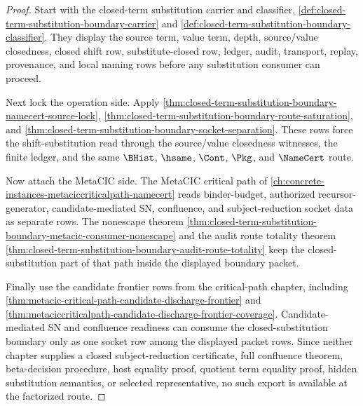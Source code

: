 \begin{proof}
Start with the closed-term substitution carrier and classifier, \autoref{def:closed-term-substitution-boundary-carrier} and \autoref{def:closed-term-substitution-boundary-classifier}. They display the source term, value term, depth, source/value closedness, closed shift row, substitute-closed row, ledger, audit, transport, replay, provenance, and local naming rows before any substitution consumer can proceed.

Next lock the operation side. Apply \autoref{thm:closed-term-substitution-boundary-namecert-source-lock}, \autoref{thm:closed-term-substitution-boundary-route-saturation}, and \autoref{thm:closed-term-substitution-boundary-socket-separation}. These rows force the shift-substitution read through the source/value closedness witnesses, the finite ledger, and the same $\BHist$, $\hsame$, $\Cont$, $\Pkg$, and $\NameCert$ route.

Now attach the MetaCIC side. The MetaCIC critical path of \autoref{ch:concrete-instances-metaciccriticalpath-namecert} reads binder-budget, authorized recursor-generator, candidate-mediated SN, confluence, and subject-reduction socket data as separate rows. The nonescape theorem \autoref{thm:closed-term-substitution-boundary-metacic-consumer-nonescape} and the audit route totality theorem \autoref{thm:closed-term-substitution-boundary-audit-route-totality} keep the closed-substitution part of that path inside the displayed boundary packet.

Finally use the candidate frontier rows from the critical-path chapter, including \autoref{thm:metacic-critical-path-candidate-discharge-frontier} and \autoref{thm:metaciccriticalpath-candidate-discharge-frontier-coverage}. Candidate-mediated SN and confluence readiness can consume the closed-substitution boundary only as one socket row among the displayed packet rows. Since neither chapter supplies a closed subject-reduction certificate, full confluence theorem, beta-decision procedure, host equality proof, quotient term equality proof, hidden substitution semantics, or selected representative, no such export is available at the factorized route.
\end{proof}
